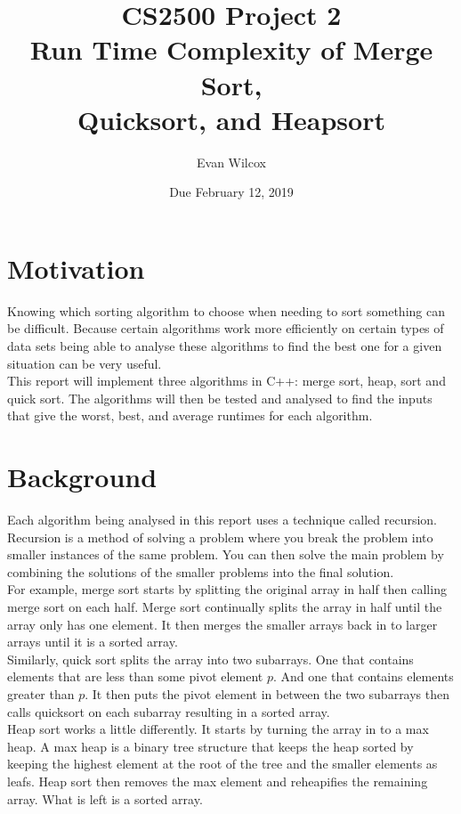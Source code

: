 \documentclass[a4paper]{article}
\title{CS2500 Project 2 \\ 
       Run Time Complexity of Merge Sort, \\ 
       Quicksort, and Heapsort}
\author{Evan Wilcox}
\date{Due February 12, 2019}
\begin{document}
    \maketitle

    \section{Motivation}
    Knowing which sorting algorithm to choose when needing to sort something can be 
    difficult. Because certain algorithms work more efficiently on certain types
    of data sets being able to analyse these algorithms to find the best one 
    for a given situation can be very useful. \\

    This report will implement three algorithms in C++: merge sort, heap, sort and 
    quick sort. The algorithms will then be tested and analysed to find the inputs 
    that give the worst, best, and average runtimes for each algorithm.



    \section{Background}
    Each algorithm being analysed in this report uses a technique called recursion.
    Recursion is a method of solving a problem where you break the problem into smaller
    instances of the same problem. You can then solve the main problem by combining the 
    solutions of the smaller problems into the final solution. \\

    For example, merge sort starts by splitting the original array in half then calling
    merge sort on each half. Merge sort continually splits the array in half until
    the array only has one element. It then merges the smaller arrays back in
    to larger arrays until it is a sorted array. \\

    Similarly, quick sort splits the array into two subarrays. One that contains 
    elements that are less than some pivot element $p$. And one that contains elements 
    greater than $p$. It then puts the pivot element in between the two subarrays 
    then calls quicksort on each subarray resulting in a sorted array. \\

    Heap sort works a little differently. It starts by turning the array in to a max 
    heap. A max heap is a binary tree structure that keeps the heap sorted by keeping
    the highest element at the root of the tree and the smaller elements as leafs. 
    Heap sort then removes the max element and reheapifies the remaining array. What
    is left is a sorted array.
\end{document}
